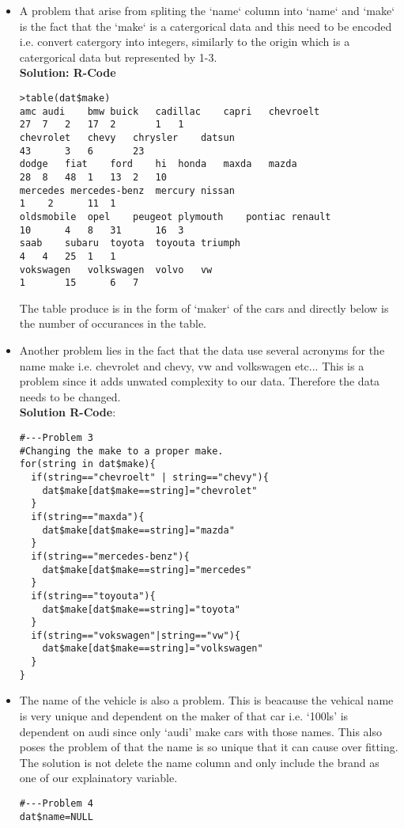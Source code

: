 \documentclass[11pt]{article} %
\begin{document}
\begin{itemize}
\item A problem that arise from spliting the `name` column into `name` and `make` is the fact that the `make` is a catergorical data and this need to be encoded i.e. convert catergory into integers, similarly to the origin which is a catergorical data but represented by 1-3.\\
\textbf{Solution: R-Code}
\begin{lstlisting}
>table(dat$make)
amc	audi	bmw	buick	cadillac	capri	chevroelt
27	7	2 	17	2 		1 	1 
chevrolet	chevy	chrysler	datsun 
43		3 	6 		23 
dodge	fiat	ford	hi	honda	maxda	mazda
28 	8	48 	1	13	2	10	
mercedes mercedes-benz	mercury	nissan 
1	 2		11	1 
oldsmobile	opel 	peugeot	plymouth	pontiac	renault
10		4	8	31		16	3
saab	subaru	toyota	toyouta	triumph
4	4	25	1	1 
vokswagen	volkswagen 	volvo	vw 
1		15		6	7 
\end{lstlisting}
The table produce is in the form of `maker` of the cars and directly below is the number of occurances in the table.

\item Another problem lies in the fact that the data use several acronyms for the name make i.e. chevrolet and chevy, vw and volkswagen etc... This is a problem since it adds unwated complexity to our data. Therefore the data needs to be changed.\\
\textbf{Solution R-Code}:
\begin{lstlisting}
#---Problem 3
#Changing the make to a proper make.
for(string in dat$make){
  if(string=="chevroelt" | string=="chevy"){
    dat$make[dat$make==string]="chevrolet"
  }
  if(string=="maxda"){
    dat$make[dat$make==string]="mazda"
  }
  if(string=="mercedes-benz"){
    dat$make[dat$make==string]="mercedes"
  }
  if(string=="toyouta"){
    dat$make[dat$make==string]="toyota"
  }
  if(string=="vokswagen"|string=="vw"){
    dat$make[dat$make==string]="volkswagen"
  }
}
\end{lstlisting}

\item The name of the vehicle is also a problem. This is beacause the vehical name is very unique and dependent on the maker of that car i.e. `100ls' is dependent on audi since only `audi' make cars with those names. This also poses the problem of that the name is so unique that it can cause over fitting. The solution is not delete the name column and only include the brand as one of our explainatory variable.
\begin{lstlisting}
#---Problem 4
dat$name=NULL
\end{lstlisting}
\end{itemize}
\end{document}
